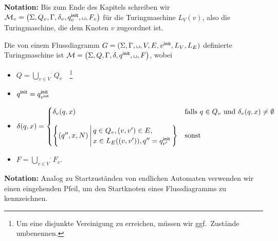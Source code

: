 \textbf{Notation:}
Bis zum Ende des Kapitels schreiben wir
$\M_v=\left(\Sigma,Q_v,\Gamma,\delta_v,\qinit_v,\blank,F_v\right)$
für die Turingmaschine $L_V(v)$, also die Turingmaschine, die dem Knoten $v$ zugeordnet ist.

\begin{Def}[name={[Von Flussdiagram definierte \ac{TM}]}]
	Die von einem Flussdiagramm $G=(\Sigma, \Gamma, \blank,V,E,v^\mathsf{init},L_V,L_E)$ definierte Turingmaschine ist 
	$\M=\left(\Sigma,Q,\Gamma,\delta,\qinit,\blank,F\right)$, wobei
	\begin{itemize}
		\item $Q=\overset{.}{\bigcup\limits_{v\in V}} Q_v$~~\footnote{Um eine disjunkte Vereinigung zu erreichen, müssen wir ggf.\ Zustände umbenennen.}
		\item $q^\mathsf{init} = q^\mathsf{init}_{v^\mathsf{init}}$
		\item $\delta(q,x) = 
		\begin{cases}
			\delta_v(q,x) & \text{falls } q\in Q_v \text{ und }  \delta_v(q,x)\neq\emptyset \\[4mm]
			\left\{(q'',x,N) \,\middle|\, \begin{array}{@{}l@{\,}}
				q\in Q_v, (v,v')\in E,\\
				x\in L_E((v,v')), q''=\qinit_{{v'}}
			\end{array}\right\} & \text{sonst }
		\end{cases}$
		\item $F=\overset{.}{\bigcup\limits_{v\in V}} F_v$.
		\qedhere
	\end{itemize}
\end{Def}

\textbf{Notation:}
Analog zu Startzuständen von endlichen Automaten verwenden wir einen eingehenden Pfeil, um den Startknoten eines Flussdiagramms zu kennzeichnen.

